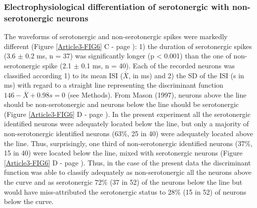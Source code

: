 \documentclass[a4paper,12pt,twoside]{report}
\begin{document}
\subsubsection{Electrophysiological differentiation of serotonergic with non-serotonergic neurons }

The waveforms of serotonergic and non-serotonergic spikes were markedly different (Figure \ref{Article3-FIG6} C - page \pageref{Article3-FIG6}): 1) the duration of serotonergic spikes (3.6 $\pm$ 0.2 ms, n = 37) was significantly longer (p < 0.001) than the one of non-serotonergic spike (2.1 $\pm$ 0.1 ms, n = 40).
Each of the recorded neurons was classified according 1) to its mean ISI ($\bar{X}$, in ms) and 2) the SD of the ISI (s in ms) with regard to a straight line representing the discriminant function $146-\bar{X}+0.98s=0$ (see Methods). From Mason (1997), neurons above the line should be non-serotonergic and neurons below the line should be serotonergic (Figure \ref{Article3-FIG6} D - page \pageref{Article3-FIG6}). In the present experiment all the serotonergic identified neurons were adequately located below the line, but only a majority of non-serotonergic identified neurons (63\%, 25 in 40) were adequately located above the line. Thus, surprisingly, one third of non-serotonergic identified neurons (37\%, 15 in 40) were located below the line, mixed with serotonergic neurons (Figure \ref{Article3-FIG6} D - page \pageref{Article3-FIG6}). Thus, in the case of the present data the discriminant function was able to classify adequately as non-serotonergic all the neurons above the curve and as serotonergic 72\% (37 in 52) of the neurons below the line but would have miss-attributed the serotonergic status to 28\% (15 in 52) of neurons below the curve.
\end{document}
